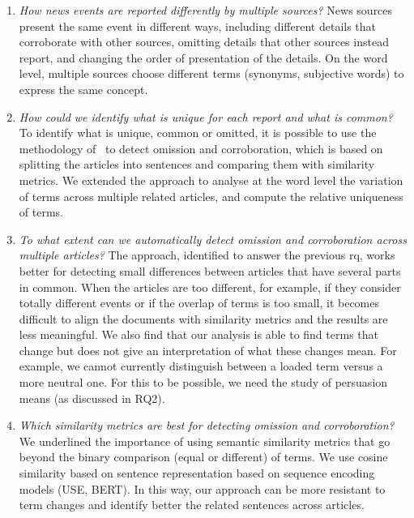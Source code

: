 \begin{enumerate}[label={\textbf{RQ1.\arabic*:}},leftmargin=2cm]
    \item \emph{How news events are reported differently by multiple sources?} News sources present the same event in different ways, including different details that corroborate with other sources, omitting details that other sources instead report, and changing the order of presentation of the details.
    On the word level, multiple sources choose different terms (synonyms, subjective words) to express the same concept. %
    \item \emph{How could we identify what is unique for each report and what is common?} To identify what is unique, common or omitted, it is possible to use the methodology of~\citet{bountouridis2018explaining} to detect omission and corroboration, %
    which is based on splitting the articles into sentences and comparing them with similarity metrics. We extended the approach to analyse at the word level the variation of terms across multiple related articles, and compute the relative uniqueness of terms.%
    \item \emph{To what extent can we automatically detect omission and corroboration across multiple articles?} The approach, identified to answer the previous \acrshort{rq}, works better for detecting small differences between articles that have several parts in common. When the articles are too different, for example, if they consider totally different events or if the overlap of terms is too small, it becomes difficult to align the documents with similarity metrics and the results are less meaningful. We also find that our analysis is able to find terms that change but does not give an interpretation of what these changes mean. For example, we cannot currently distinguish between a loaded term versus a more neutral one. For this to be possible, we need the study of persuasion means (as discussed in RQ2).
    \item \emph{Which similarity metrics are best for detecting omission and corroboration?} We underlined %
    the importance of using semantic similarity metrics that go beyond the binary comparison (equal or different) of terms. We use cosine similarity based on sentence representation based on sequence encoding models (USE, BERT). In this way, our approach can be more resistant to term changes and identify better the related sentences across articles.
\end{enumerate}


